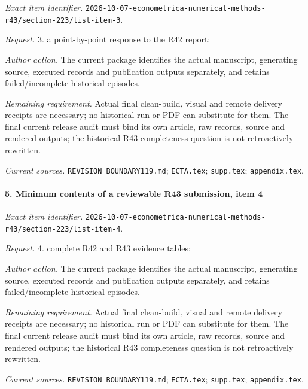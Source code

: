 \emph{Exact item identifier.} \nolinkurl{2026-10-07-econometrica-numerical-methods-r43/section-223/list-item-3}.

\par\emph{Request.} 3. a point-by-point response to the R42 report;

\par\emph{Author action.} The current package identifies the actual manuscript, generating source, executed records and publication outputs separately, and retains failed/\allowbreak{}incomplete historical episodes.

\par\emph{Remaining requirement.} Actual final clean-build, visual and remote delivery receipts are necessary; no historical run or PDF can substitute for them. The final current release audit must bind its own article, raw records, source and rendered outputs; the historical R43 completeness question is not retroactively rewritten.

\par\emph{Current sources.} \nolinkurl{REVISION_BOUNDARY119.md}; \nolinkurl{ECTA.tex}; \nolinkurl{supp.tex}; \nolinkurl{appendix.tex}.

\paragraph{5. Minimum contents of a reviewable R43 submission, item 4}

\emph{Exact item identifier.} \nolinkurl{2026-10-07-econometrica-numerical-methods-r43/section-223/list-item-4}.

\par\emph{Request.} 4. complete R42 and R43 evidence tables;

\par\emph{Author action.} The current package identifies the actual manuscript, generating source, executed records and publication outputs separately, and retains failed/\allowbreak{}incomplete historical episodes.

\par\emph{Remaining requirement.} Actual final clean-build, visual and remote delivery receipts are necessary; no historical run or PDF can substitute for them. The final current release audit must bind its own article, raw records, source and rendered outputs; the historical R43 completeness question is not retroactively rewritten.

\par\emph{Current sources.} \nolinkurl{REVISION_BOUNDARY119.md}; \nolinkurl{ECTA.tex}; \nolinkurl{supp.tex}; \nolinkurl{appendix.tex}.

